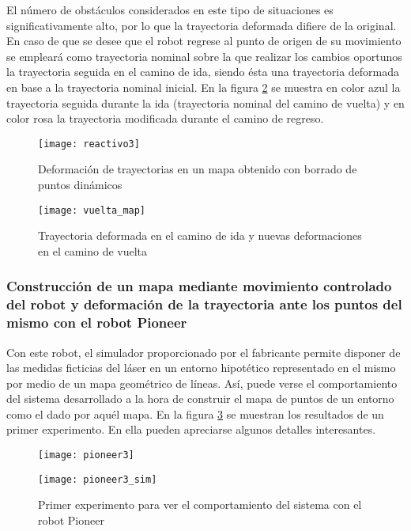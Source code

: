 El número de obstáculos considerados en este tipo de situaciones es significativamente alto, por lo que la trayectoria deformada difiere de la original. En caso de que se desee que el robot regrese al punto de origen de su movimiento se empleará como trayectoria nominal sobre la que realizar los cambios oportunos la trayectoria seguida en el camino de ida, siendo ésta una trayectoria deformada en base a la trayectoria nominal inicial. En la figura \ref{fg:vuelta_map} se muestra en color azul la trayectoria seguida durante la ida (trayectoria nominal del camino de vuelta) y en color rosa la trayectoria modificada durante el camino de regreso.

\begin{figure}[hb]
  \centering\texttt{[image: reactivo3]}
  \caption{Deformación de trayectorias en un mapa obtenido con borrado de puntos dinámicos}\label{fg:react3c}
\end{figure}

\begin{figure}[h]
  \centering\texttt{[image: vuelta\_map]}\\
  \caption{Trayectoria deformada en el camino de ida y nuevas deformaciones en el camino de vuelta}\label{fg:vuelta_map}
\end{figure}

\clearpage

\subsubsection{Construcción de un mapa mediante movimiento controlado del robot y deformación de la trayectoria ante los puntos del mismo con el robot Pioneer}

Con este robot, el simulador proporcionado por el fabricante permite disponer de las medidas ficticias del láser en un entorno hipotético representado en el mismo por medio de un mapa geométrico de líneas. Así, puede verse el comportamiento del sistema desarrollado a la hora de construir el mapa de puntos de un entorno como el dado por aquél mapa. En la figura \ref{fg:pioneerSim1a} se muestran los resultados de un primer experimento. En ella pueden apreciarse algunos detalles interesantes.

\begin{figure}[h]
  \centering\texttt{[image: pioneer3]}

  \vspace{0.5cm}

  \centering\texttt{[image: pioneer3\_sim]}
  \caption{Primer experimento para ver el comportamiento del sistema con el robot Pioneer}\label{fg:pioneerSim1a}
\end{figure}

